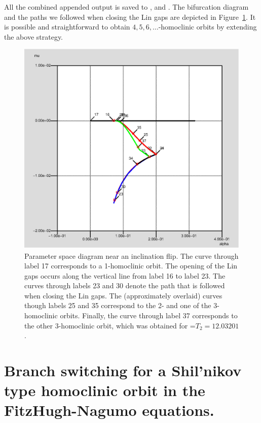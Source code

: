\documentclass[12pt]{report}
\begin{document}
All the combined appended output is saved to , 
and .
The bifurcation diagram and the paths we followed when closing the Lin
gaps are depicted in Figure~\ref{parspace}. It is possible and
straightforward to obtain $4, 5, 6, \dots$-homoclinic orbits by 
extending the above strategy.
\begin{figure}[htb]
\begin{center}
\includegraphics[scale=0.5]{include/parspace.eps}
\caption{Parameter space diagram near an inclination flip. 
The curve
through label 17 corresponds to a 1-homoclinic orbit. 
The opening of the Lin gaps occurs along the vertical line from
label 16 to label 23. The curves
through labels 23 and 30 denote the path that is followed when
closing the Lin gaps. The (approximately overlaid)
curves though labels 25 and 35 correspond to the 
2- and one of the 3-homoclinic orbits.
Finally, the curve through label 37 corresponds to the other
3-homoclinic orbit, which was obtained for =$T_2=12.03201$.}
\label{parspace}
\end{center}
\end{figure}

\section{ Branch switching for a Shil'nikov type homoclinic orbit in
the FitzHugh-Nagumo equations.}
\end{document}
